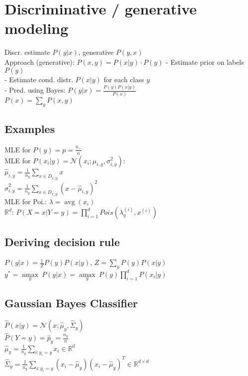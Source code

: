 \section*{Discriminative / generative modeling}
Discr. estimate $P(y|x)$, generative $P(y,x)$ \\
Approach (generative): $P(x,y) = P(x|y) \cdot P(y)$
- Estimate prior on labels $P(y)$\\
- Estimate cond. distr. $P(x|y)$ for each class $y$\\
- Pred. using Bayes:
$P(y|x) = \frac{P(y) P(x|y)}{P(x)}$\\
$P(x) = \sum_y P(x,y)$


\subsection*{Examples}
MLE for $P(y) = p = \frac{n_+}{n}$\\
MLE for $P(x_i|y) = \mathcal{N}(x_i;\mu_{i,y}, \sigma_{i,y}^2)$:\\
$\hat{\mu}_{i,y} = \frac{1}{n_y} \sum_{x\in D_{x_i|y}} x$\\
$\hat{\sigma}_{i,y}^2 = \frac{1}{n_y} \sum_{x\in D_{x_i|y}} (x-\hat{\mu}_{i,y})^2$\\
MLE for Poi.: $\lambda = \operatorname{avg}(x_i) $\\
$\mathbb{R}^d$: $P(X = x|Y = y) = \prod_{i=1}^dPois(\lambda_y^{(i)},x^{(i)})$


\subsection*{Deriving decision rule}
$P(y|x) = \frac{1}{Z} P(y)P(x|y)$, $Z = \sum_y P(y) P(x|y)$\\
$y^* = \underset{y}{\operatorname{amax}} ~ P(y|x) = 
\underset{y}{\operatorname{amax}} ~ P(y) \prod_{i=1}^d P(x_i|y)$

\subsection*{Gaussian Bayes Classifier}
$\hat{P}(x|y) = \mathcal{N}(x ; \hat{\mu}_y, \hat{\Sigma}_y)$\\
$\hat{P}(Y=y) = \hat{p}_y = \frac{n_y}{n}$\\
$\hat{\mu}_{y} = \frac{1}{n_y} \sum_{i:y_i=y} x_i \in \mathbb{R}^d$\\
$\hat{\Sigma}_{y} = \frac{1}{n_y} \sum_{i:y_i=y} (x_i - \hat{\mu}_{y})(x_i-\hat{\mu}_y)^T \in \mathbb{R}^{d \times d}$

